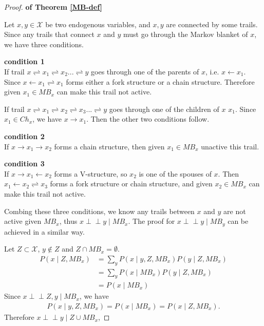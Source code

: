 \documentclass[twoside,11pt]{article}
\begin{document}
\begin{proof}{\textbf{of Theorem \ref{MB-def}}}

Let $x, y\in\mathcal X$ be two endogenous variables, and $x,y$ are connected by some trails. Since any trails that connect $x$ and $y$ must go through the Markov blanket of $x$, we have three conditions.

\textbf{condition 1}\\
If trail $x\rightleftharpoons x_1\rightleftharpoons x_2 ... \rightleftharpoons y$ goes through one of the parents of $x$, i.e. $x\gets x_1$. Since $x\gets x_1\rightleftharpoons x_1$ forms either a fork structure or a chain structure. Therefore given $x_1\in MB_x$ can make this trail not active. 

If trail $x\rightleftharpoons x_1\rightleftharpoons x_2\rightleftharpoons x_3 ... \rightleftharpoons y$ goes through one of the children of $x$ $x_1$. Since $x_1\in Ch_x$, we have $x\to x_1$. Then the other two conditions follow.

\textbf{condition 2}\\
If $x\to x_1\to x_2$ forms a chain structure, then given $x_1\in MB_x$ unactive this trail.

\textbf{condition 3}\\
If $x\to x_1\gets x_2$ forms a V-structure, so $x_2$ is one of the spouses of $x$. Then $x_1\gets x_2\rightleftharpoons x_3$ forms a fork structure or chain structure, and given $x_2\in MB_x$ can make this trail not active.

Combing these three conditions, we know any trails between $x$ and $y$ are not active given $MB_x$, thus $x\perp\!\!\!\perp y\mid MB_x$. The proof for $x\perp\!\!\!\perp y\mid MB_y$ can be achieved in a similar way.

Let $Z\subset\mathcal X$, $y\notin Z$ and $Z\cap MB_x=\emptyset$.
\begin{align*}
P(x\mid Z,MB_x)&=\sum_{y} P(x\mid y, Z, MB_x)P(y\mid Z, MB_x)\\
&=\sum_y P(x\mid MB_x)P(y\mid Z, MB_x)\\
&=P(x\mid MB_x)
\end{align*}
Since $x\perp\!\!\!\perp Z,y\mid MB_x$, we have
\begin{align*}
P(x\mid y, Z, MB_x)=P(x\mid MB_x)=P(x\mid Z, MB_x).
\end{align*}
Therefore $x\perp\!\!\!\perp y\mid Z\cup MB_x$,
\end{proof}
\end{document}
